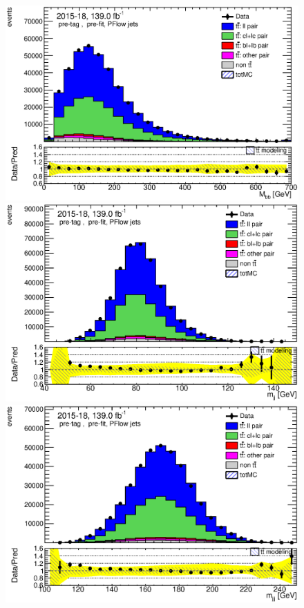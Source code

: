 \documentclass[letterpaper,12pt]{article}
\begin{document}
	
	\begin{figure}
	\begin{minipage}[b]{.45\textwidth}
	\centering
	\includegraphics[width=1\textwidth]{Oct_distributions/pretagNoRwDL1rwithhighpTPFlow_scaledall/DataMC_Mbb.eps}
	\end{minipage}\hfill
	\begin{minipage}[b]{.45\textwidth}
	\centering
	\includegraphics[width=1\textwidth]{Oct_distributions/pretagNoRwDL1rwithhighpTPFlow_scaledall/DataMC_mjj.eps}
	\end{minipage}
	\begin{minipage}[b]{.45\textwidth}
	\centering
	\includegraphics[width=1\textwidth]{Oct_distributions/pretagNoRwDL1rwithhighpTPFlow_scaledall/DataMC_mjjj.eps}

\end{minipage}
\end{figure}
\end{document}
